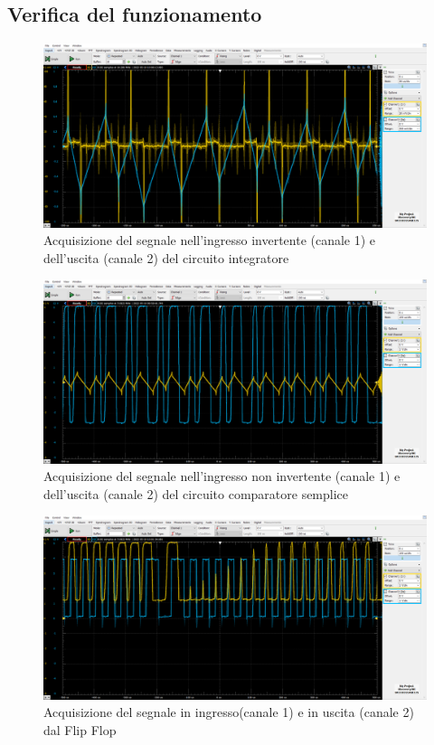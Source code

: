\documentclass[10pt, a4paper, italian]{article}
\begin{document}
\subsection{Verifica del funzionamento}
\begin{figure}[htbp]
    \centering
	\includegraphics[width=\textwidth]{MIDDLE.U1.InputVSOutput}
    \caption{Acquisizione del segnale nell'ingresso invertente (canale 1) e dell'uscita (canale 2) del circuito integratore}
\end{figure}
\begin{figure}[htbp]
    \centering
	\includegraphics[width=\textwidth]{MIDDLE.U2.InputVSOutput}
    \caption{Acquisizione del segnale nell'ingresso non invertente (canale 1) e dell'uscita (canale 2) del circuito comparatore semplice}
\end{figure}
\begin{figure}[htbp]
    \centering
	\includegraphics[width=\textwidth]{MIDDLE.U3.InputVSOutput}
    \caption{Acquisizione del segnale in ingresso(canale 1) e in uscita (canale 2) dal Flip Flop}
\end{figure}
\end{document}

